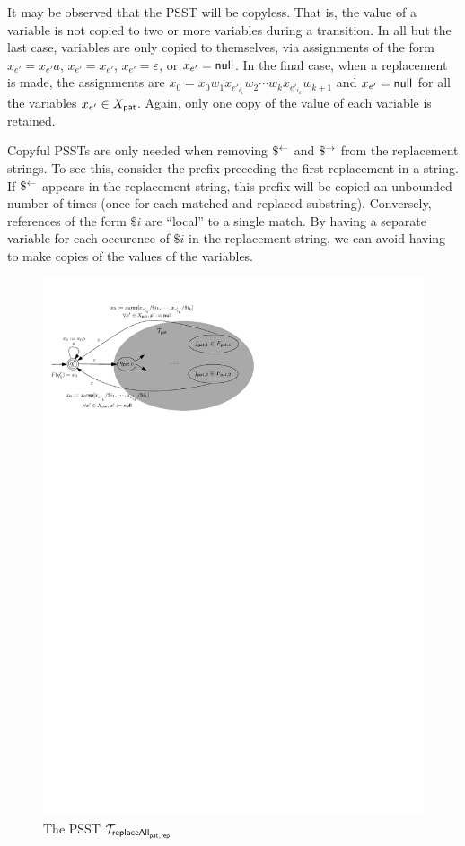 It may be observed that the PSST will be copyless.
That is, the value of a variable is not copied to two or more variables during a transition.
In all but the last case, variables are only copied to themselves, via assignments of the form $x_{e'} = x_{e'} a$, $x_{e'} = x_{e'}$, $x_{e'} = \varepsilon$, or $x_{e'} = \mathsf{null}$.
In the final case, when a replacement is made, the assignments are
$x_0 = x_0 w_1 x_{e'_{i_1}} w_2 \cdots w_k x_{e'_{i_k}} w_{k+1}$
and
$x_{e'} = \mathsf{null}$ for all the variables $x_{e'} \in X_{\mathsf{pat}}$.
Again, only one copy of the value of each variable is retained.

Copyful PSSTs are only needed when removing $\$^{\leftarrow}$ and $\$^{\rightarrow}$ from the replacement strings.
To see this, consider the prefix preceding the first replacement in a string.
If $\$^{\leftarrow}$ appears in the replacement string, this prefix will be copied an unbounded number of times (once for each matched and replaced substring).
Conversely, references of the form $\$i$ are ``local'' to a single match.
By having a separate variable for each occurence of $\$i$ in the replacement string, we can avoid having to make copies of the values of the variables.

\begin{figure}[ht]
    \centering
    \includegraphics[scale=0.7]{psst-replaceall.pdf}
    \caption{The PSST $\mathcal{T}_{\mathsf{replaceAll}_{\mathsf{pat},\mathsf{rep}}}$}
    \label{fig-psst-replaceall}
    \vspace{-2mm}
\end{figure}


